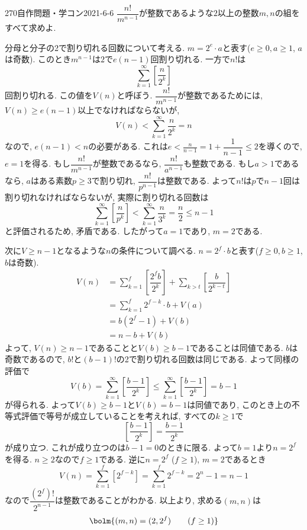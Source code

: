 \begin{thm}{270}{}{自作問題・学コン2021-6-6}
$\dfrac{n!}{m^{n-1}}$が整数であるような$2$以上の整数$m,n$の組をすべて求めよ. 
\end{thm}

分母と分子の2で割り切れる回数について考える. $m=2^{e}\cdot a$と表す($e\geq 0, a\geq 1$, $a$は奇数). 
このとき$m^{n-1}$は$2$で$e(n-1)$回割り切れる. 一方で$n!$は
\[
\sum_{k=1}^{\infty} \left[ \dfrac{n}{2^k} \right]    
\] 
回割り切れる. この値を$V(n)$と呼ぼう. $\dfrac{n!}{m^{n-1}}$が整数であるためには, $V(n)\geq e(n-1)$以上でなければならないが, 
\[
    V(n) <  \sum_{k=1}^{\infty} \dfrac{n}{2^k} = n    
\]
なので, $e(n-1) < n$の必要がある. これは$e< \frac{n}{n-1} = 1 + \dfrac{1}{n-1} \leq 2$を導くので, $e=1$を得る. 
もし$\dfrac{n!}{m^{n-1}}$が整数であるなら, $\dfrac{n!}{a^{n-1}}$も整数である. もし$a>1$であるなら, $a$はある素数$p\geq 3$で割り切れ, $\dfrac{n!}{p^{n-1}}$は整数である. 
よって$n!$は$p$で$n-1$回は割り切れなければならないが, 実際に割り切れる回数は
\[
\sum_{k=1}^{\infty} \left[ \dfrac{n}{p^k}\right] < \sum_{k=1}^{\infty} \dfrac{n}{3^k} = \dfrac{n}{2} \leq n-1     
\]
と評価されるため, 矛盾である. したがって$a=1$であり, $m = 2$である. \par 
次に$V \geq n-1$となるような$n$の条件について調べる. $n=2^{f}\cdot b$と表す($f\geq 0, b\geq 1$, $b$は奇数). 
\begin{align*}
    V(n) &= \sum_{k=1}^{f} \left[ \dfrac{2^{f}b}{2^{k}} \right] + \sum_{k>t} \left[\dfrac{b}{2^{k-t}}\right] \\ 
      &= \sum_{k=1}^{f} 2^{f-k} \cdot b + V(a) \\ 
      &= b(2^{f} - 1) + V(b) \\ 
      &= n - b + V(b) 
\end{align*}
よって, $V(n) \geq n-1$であることと$V(b) \geq b-1$であることは同値である. $b$は奇数であるので, $b!$と$(b-1)!$の2で割り切れる回数は同じである. よって同様の評価で
\[
V(b) = \sum_{k=1}^{\infty} \left[ \dfrac{b-1}{2^{k}} \right] \leq \sum_{k=1}^{\infty} \left[\dfrac{b-1}{2^k} \right] = b-1   
\]
が得られる. よって$V(b) \geq b-1$と$V(b) = b-1$は同値であり, このとき上の不等式評価で等号が成立していることを考えれば, すべての$k\geq 1$で
\[
\left[\dfrac{b-1}{2^k}\right] = \dfrac{b-1}{2^k}    
\]
が成り立つ. これが成り立つのは$b-1=0$のときに限る. よって$b=1$より$n=2^{f}$を得る. $n\geq 2$なので$f\geq 1$である. 逆に$n=2^{f}$ ($f\geq 1$), $m=2$であるとき
\[V(n) = \sum_{k=1}^{f} [2^{f-k}] = \sum_{k=1}^{f} 2^{f-k} =  2^{n} - 1  = n-1\]
なので$\dfrac{(2^{f})!}{2^{n-1}}$は整数であることがわかる. 以上より, 求める$(m,n)$は
\[
\bolm{(m,n) = (2,2^{f})\qquad (f\geq 1)}
\]
